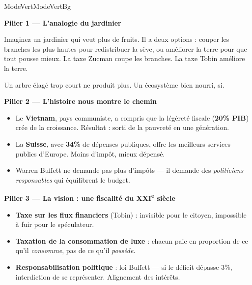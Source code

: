 \documentclass[a4paper,11pt]{article}
\newcommand{\stat}[1]{\textbf{\textcolor{ChapColor}{#1}}}
\begin{document}
\begin{fichemode}{ModeVert}{ModeVertBg}

\textbf{\textcolor{ModeVertDark}{ Pilier 1 --- L'analogie du jardinier}}

Imaginez un jardinier qui veut plus de fruits. Il a deux options : couper les branches les plus hautes pour \og{}redistribuer\fg{} la s\`eve, ou am\'eliorer la terre pour que tout pousse mieux. La taxe Zucman coupe les branches. La taxe Tobin am\'eliore la terre.

Un arbre \'elag\'e trop court ne produit plus. Un \'ecosyst\`eme bien nourri, si.

\vspace{3mm}
\textbf{\textcolor{ModeVertDark}{ Pilier 2 --- L'histoire nous montre le chemin}}

\begin{itemize}[label=\textcolor{ModeVert}{}, itemsep=3pt]
  \item Le \textbf{Vietnam}, pays communiste, a compris que la l\'eg\`eret\'e fiscale (\stat{20\% PIB}) cr\'ee de la croissance. R\'esultat : sorti de la pauvret\'e en une g\'en\'eration.
  \item La \textbf{Suisse}, avec \stat{34\%} de d\'epenses publiques, offre les meilleurs services publics d'Europe. Moins d'imp\^ot, mieux d\'epens\'e.
  \item Warren Buffett ne demande pas plus d'imp\^ots --- il demande des \emph{politiciens responsables} qui \'equilibrent le budget.
\end{itemize}

\vspace{3mm}
\textbf{\textcolor{ModeVertDark}{ Pilier 3 --- La vision : une fiscalit\'e du XXI\textsuperscript{e} si\`ecle}}

\begin{itemize}[label=\textcolor{ModeVert}{}, itemsep=3pt]
  \item \textbf{Taxe sur les flux financiers} (Tobin) : invisible pour le citoyen, impossible \`a fuir pour le sp\'eculateur.
  \item \textbf{Taxation de la consommation de luxe} : chacun paie en proportion de ce qu'il \emph{consomme}, pas de ce qu'il \emph{poss\`ede}.
  \item \textbf{Responsabilisation politique} : loi Buffett --- si le d\'eficit d\'epasse 3\%, interdiction de se repr\'esenter. Alignement des int\'er\^ets.
\end{itemize}

\end{fichemode}
\end{document}
